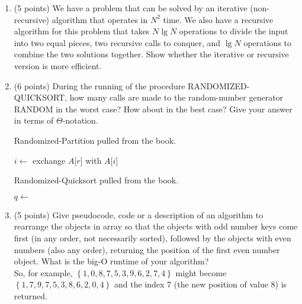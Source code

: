 \documentclass[2]{cs430homework}
\begin{document}
\maketitle

\begin{enumerate}[label=\arabic*.]
	\item (5 points) We have a problem that can be solved by an iterative (non-recursive) algorithm that operates in $N^{2}$ time. We also have a recursive algorithm for this problem that takes $N \lg N$ operations to divide the input into two equal pieces, two recursive calls to conquer, and $\lg N$ operations to combine the two solutions together. Show whether the iterative or recursive version is more efficient.
	\item (6 points) During the running of the procedure RANDOMIZED-QUICKSORT, how many calls are made to the random-number generator RANDOM in the worst case? How about in the best case? Give your answer in terms of $\Theta$-notation.\begin{algorithm}[H]
		\caption{Randomized-Partition pulled from the book.}\label{alg:randomized-partition}
		\begin{algorithmic}[1]
			\State $i \gets$ 
			\State exchange $A$[$r$] with $A$[$i$]
			\State \Return {}
		\EndFunction
		\end{algorithmic}
	\end{algorithm}\begin{algorithm}[H]
			\caption{Randomized-Quicksort pulled from the book.}\label{alg:randomized-quicksort}
			\begin{algorithmic}[1]
					\State $q \gets $ 
					\State {}
					\State {}
				\EndIf
			\EndFunction
			\end{algorithmic}
		\end{algorithm}
	\item (5 points) Give pseudocode, code or a description of an algorithm to rearrange the objects in array so that the objects with odd number keys come first (in any order, not necessarily sorted), followed by the objects with even numbers (also any order), returning the position of the first even number object. What is the big-O runtime of your algorithm? \\
	So, for example, $\left\{1,0,8,7,5,3,9,6,2,7,4\right\}$ might become $\left\{1,7,9,7,5,3,8,6,2,0,4\right\}$ and the index 7 (the new position of value 8) is returned.

\end{enumerate}
\end{document}
